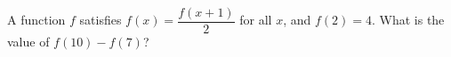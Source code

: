 A function $f$ satisfies $f(x)=\dfrac{f(x+1)}{2}$ for all $x$, and $f(2)=4$. What is the value of $f(10)-f(7)$?
